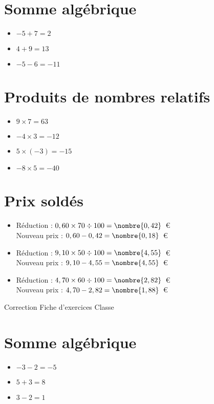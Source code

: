 \documentclass[a4paper,11pt,fleqn]{article}
\begin{document}
\section{Somme algébrique}
\begin{itemize}

  \item $-5 +7=2$
  \item $4 +9=13$
  \item $-5 -6=-11$
\end{itemize}

\section{Produits de nombres relatifs}
\begin{itemize}

  \item $9\times7=63$
  \item $-4\times3=-12$
  \item $5\times(-3)=-15$
  \item $-8\times5=-40$
\end{itemize}

\section{Prix soldés}
\begin{itemize}

  \item Réduction : $0,60\times70\div100=\nombre{0,42}$~€\\
  Nouveau prix : $0,60-0,42=\nombre{0,18}$~€
  \item Réduction : $9,10\times50\div100=\nombre{4,55}$~€\\
  Nouveau prix : $9,10-4,55=\nombre{4,55}$~€
  \item Réduction : $4,70\times60\div100=\nombre{2,82}$~€\\
  Nouveau prix : $4,70-2,82=\nombre{1,88}$~€
\end{itemize}
\newpage
\setcounter{exo}{0}
\setcounter{section}{0}
{Correction} \hfill {\huge Fiche d'exercices } \hfill {Classe}

\section{Somme algébrique}
\begin{itemize}

  \item $-3 -2=-5$
  \item $5 +3=8$
  \item $3 -2=1$
\end{itemize}
\end{document}
